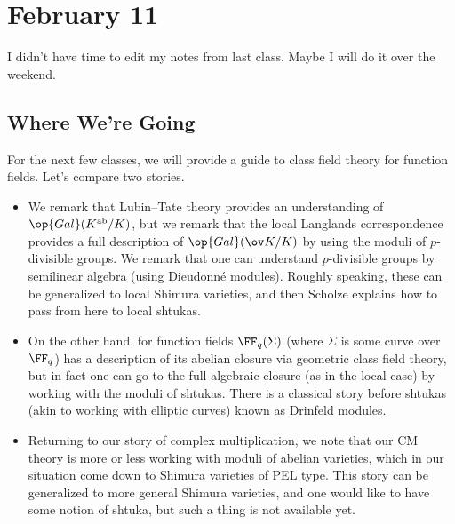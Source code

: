 \documentclass[../notes.tex]{subfiles}
\begin{document}
\section{February 11}

I didn't have time to edit my notes from last class. Maybe I will do it over the weekend.

\subsection{Where We're Going}
For the next few classes, we will provide a guide to class field theory for function fields. Let's compare two stories.
\begin{itemize}
	\item We remark that Lubin--Tate theory provides an understanding of $\op{Gal}(K^{\mathrm{ab}}/K)$, but we remark that the local Langlands correspondence provides a full description of $\op{Gal}(\ov K/K)$ by using the moduli of $p$-divisible groups. We remark that one can understand $p$-divisible groups by semilinear algebra (using Dieudonn\'e modules). Roughly speaking, these can be generalized to local Shimura varieties, and then Scholze explains how to pass from here to local shtukas.
	\item On the other hand, for function fields $\FF_q(\Sigma)$ (where $\Sigma$ is some curve over $\FF_q$) has a description of its abelian closure via geometric class field theory, but in fact one can go to the full algebraic closure (as in the local case) by working with the moduli of shtukas. There is a classical story before shtukas (akin to working with elliptic curves) known as Drinfeld modules.
	\item Returning to our story of complex multiplication, we note that our CM theory is more or less working with moduli of abelian varieties, which in our situation come down to Shimura varieties of PEL type. This story can be generalized to more general Shimura varieties, and one would like to have some notion of shtuka, but such a thing is not available yet.
\end{itemize}
\end{document}
